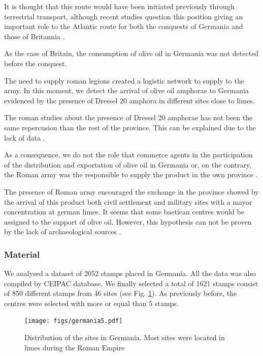 \documentclass[review]{elsarticle}
\begin{document}
It is thought that this route would have been initiated previously through 
terrestrial transport, although recent studies question this position giving an important role to the Atlantic route for both the conquests of Germania and those of Britannia \citep{remesal_germn_2010,rubio-campillo_ecology_2018}.

As the case of Britain, the consumption of olive oil in Germania was not detected before the conquest. 

The need to supply roman legions created a logistic network to supply to the army. In this moment, we detect the arrival of olive oil amphorae to Germania evidenced by the presence of Dressel 20 amphora in different sites close to limes. 

The roman studies about the presence of Dressel 20 amphorae has not been the same repercusion than the rest of the province. This can be explained due to the lack of data \citep{horacio2010llegada}.  

As a consequence, we do not the role that commerce agents in the participation of the distribution and exportation of olive oil in Germania or, on the contrary, the Roman army was the responsible to supply the product in the own province \citep[156]{remesal_germn_2010}. 


The presence of Roman army encouraged the exchange in the province showed by the arrival of this product both civil settlement and military sites with a mayor concentration at german limes. It seems that some baetican centres would be assigned to the support of olive oil. However, this hypothesis can not be proven by the lack of archaeological sources \citep[125]{remesal_concierto}. 


\subsubsection{Material}

We analysed a dataset of 2052 stamps placed in Germania. All the data was also compiled by CEIPAC database. We finally selected a total of 1621 stamps consist of 850 different stamps from 46 sites (see Fig. \ref{germania}). As previously before, the centres were selected with more or equal than 5 stamps. 


\begin{figure}[htp]
	\centering
\texttt{[image: figs/germania5.pdf]}
\caption{Distribution of the sites in Germania. Most sites were located in limes during the Roman Empire}
\label{germania}
\end{figure}
\end{document}
